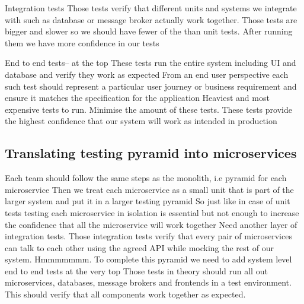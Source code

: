 \documentclass[a4paper, 11pt]{book}
\begin{document}
{    Integration tests
    Those tests verify that different units and systems we integrate with such as database or message broker actually work together.
    Those tests are bigger and slower so we should have fewer of the than unit tests.
    After running them we have more confidence in our tests

    End to end tests-- at the top
    These tests run the entire system including UI and database and verify they work as expected
    From an end user perspective each such test should represent a particular user journey or business requirement and ensure it matches the specification for the application
    Heaviest and most expensive tests to run.
    Minimise the amount of these tests.
    These tests provide the highest confidence that our system will work as intended in production

    \subsection{Translating testing pyramid into microservices}
    Each team should follow the same steps as the monolith, i.e pyramid for each microservice
    Then we treat each microservice as a small unit that is part of the larger system and put it in a larger testing pyramid
    So just like in case of unit tests testing each microservice in isolation is essential but not enough to increase the confidence that all the microservice will work together
    Need another layer of integration tests.
    Those integration tests verify that every pair of microservices can talk to each other using the agreed API while mocking the rest of our system. Hmmmmmmm.
    To complete this pyramid we need to add system level end to end tests at the very top
    Those tests in theory should run all out microservices, databases, message brokers and frontends in a test environment.
    This should verify that all components work together as expected.

}
\end{document}
